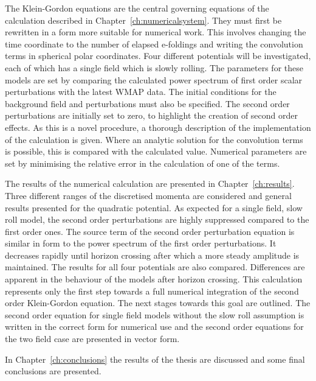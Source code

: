 The Klein-Gordon equations are the central governing equations of the 
calculation described in Chapter~\ref{ch:numericalsystem}. They must first be
rewritten in a form more suitable for numerical work. This involves changing the
time coordinate to the number of elapsed e-foldings and writing the convolution
terms in spherical polar coordinates. Four different 
potentials will be investigated, each of which has a single field which is slowly rolling. The
parameters for these models are set by
comparing
the calculated power spectrum of first order scalar perturbations with the latest
WMAP data. The initial conditions for the background field and perturbations must
also be specified. The second order perturbations are initially set to zero, to
highlight the creation of second order effects. As this is a novel procedure, a
thorough description of the implementation of the calculation is given. Where
an analytic solution for the convolution terms is possible, this is compared
with the calculated value. Numerical parameters are set by minimising the relative
error in the calculation of one of the terms.


The results of the numerical calculation are presented in Chapter~\ref{ch:results}.
Three different ranges of the discretised momenta are considered and general
results presented for the quadratic potential. 
As expected for a single field, slow
roll model, the second order perturbations are highly suppressed compared to the
first order ones. 
The source term of the second order perturbation equation is similar in form to the
power spectrum of the first order perturbations. It decreases rapidly until
horizon
crossing after which a more steady amplitude is maintained.
% 
% 
The results for all four potentials are also compared. Differences are apparent in
the behaviour of the models after horizon crossing.
This calculation represents only the first step towards a full numerical integration
of the second order Klein-Gordon equation. The next stages towards this goal are
outlined. The second order equation for single field models without the slow roll
assumption is written in the correct form for numerical use and the second order
equations for the two field case are presented in vector form.
% 

In Chapter~\ref{ch:conclusions} the results of the thesis are discussed and some
final conclusions are presented.








